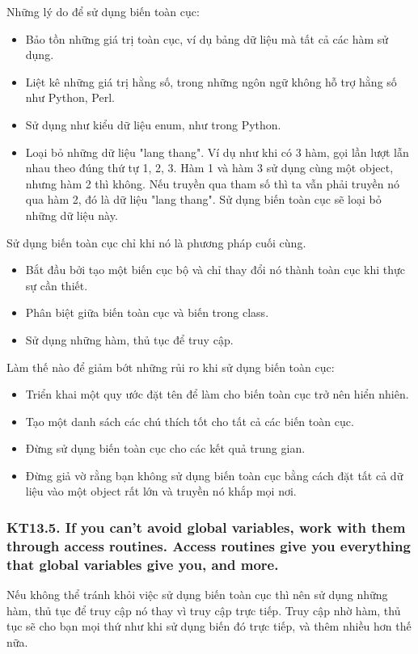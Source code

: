 \documentclass[12pt]{report}
\begin{document}
\noindent Những lý do để sử dụng biến toàn cục: 
\begin{itemize}
	\item Bảo tồn những giá trị toàn cục, ví dụ bảng dữ liệu mà tất cả các hàm sử dụng. 
	\item Liệt kê những giá trị hằng số, trong những ngôn ngữ không hỗ trợ hằng số như Python, Perl. 
	\item Sử dụng như kiểu dữ liệu enum, như trong Python. 
	\item Loại bỏ những dữ liệu "lang thang". Ví dụ như khi có 3 hàm, gọi lần lượt lẫn nhau theo đúng thứ tự 1, 2, 3.
	Hàm 1 và hàm 3 sử dụng cùng một object, nhưng hàm 2 thì không. Nếu truyền qua tham số thì ta vẫn phải truyền nó qua hàm 2, đó là dữ liệu "lang thang". Sử dụng biến toàn cục sẽ loại bỏ những dữ liệu này. 
\end{itemize}

\noindent Sử dụng biến toàn cục chỉ khi nó là phương pháp cuối cùng. 
\begin{itemize}
	\item Bắt đầu bởi tạo một biến cục bộ và chỉ thay đổi nó thành toàn cục khi thực sự cần thiết. 
	\item Phân biệt giữa biến toàn cục và biến trong class. 
	\item Sử dụng những hàm, thủ tục để truy cập.
\end{itemize}

\noindent Làm thế nào để giảm bớt những rủi ro khi sử dụng biến toàn cục:
\begin{itemize}
	\item Triển khai một quy ước đặt tên để làm cho biến toàn cục trở nên hiển nhiên. 
	\item Tạo một danh sách các chú thích tốt cho tất cả các biến toàn cục. 
	\item Đừng sử dụng biến toàn cục cho các kết quả trung gian. 
	\item Đừng giả vờ rằng bạn không sử dụng biến toàn cục bằng cách đặt tất cả dữ liệu vào một object rất lớn và truyền nó khắp mọi nơi. 
\end{itemize}

\subsubsection{KT13.5. If you can't avoid global variables, work with them through access routines. Access routines give you everything that global variables give you, and more.}
Nếu không thể tránh khỏi việc sử dụng biến toàn cục thì nên sử dụng những hàm, thủ tục để truy cập nó thay vì truy cập trực tiếp. 
Truy cập nhờ hàm, thủ tục sẽ cho bạn mọi thứ như khi sử dụng biến đó trực tiếp, và thêm nhiều hơn thế nữa. 
\vspace*{5mm}
\end{document}
